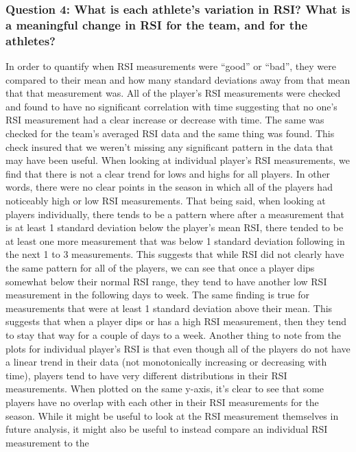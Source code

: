 \documentclass[
]{article}
\begin{document}
\subsubsection{Question 4: What is each athlete's variation in RSI? What
is a meaningful change in RSI for the team, and for the
athletes?}\label{question-4-what-is-each-athletes-variation-in-rsi-what-is-a-meaningful-change-in-rsi-for-the-team-and-for-the-athletes}

In order to quantify when RSI measurements were ``good'' or ``bad'',
they were compared to their mean and how many standard deviations away
from that mean that that measurement was. All of the player's RSI
measurements were checked and found to have no significant correlation
with time suggesting that no one's RSI measurement had a clear increase
or decrease with time. The same was checked for the team's averaged RSI
data and the same thing was found. This check insured that we weren't
missing any significant pattern in the data that may have been useful.
When looking at individual player's RSI measurements, we find that there
is not a clear trend for lows and highs for all players. In other words,
there were no clear points in the season in which all of the players had
noticeably high or low RSI measurements. That being said, when looking
at players individually, there tends to be a pattern where after a
measurement that is at least 1 standard deviation below the player's
mean RSI, there tended to be at least one more measurement that was
below 1 standard deviation following in the next 1 to 3 measurements.
This suggests that while RSI did not clearly have the same pattern for
all of the players, we can see that once a player dips somewhat below
their normal RSI range, they tend to have another low RSI measurement in
the following days to week. The same finding is true for measurements
that were at least 1 standard deviation above their mean. This suggests
that when a player dips or has a high RSI measurement, then they tend to
stay that way for a couple of days to a week. Another thing to note from
the plots for individual player's RSI is that even though all of the
players do not have a linear trend in their data (not monotonically
increasing or decreasing with time), players tend to have very different
distributions in their RSI measurements. When plotted on the same
y-axis, it's clear to see that some players have no overlap with each
other in their RSI measurements for the season. While it might be useful
to look at the RSI measurement themselves in future analysis, it might
also be useful to instead compare an individual RSI measurement to the
\end{document}
